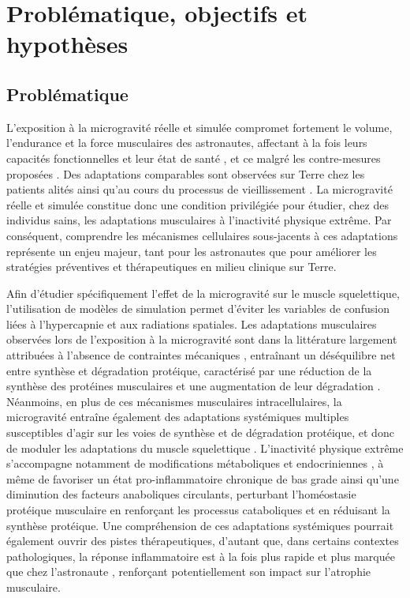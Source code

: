 \documentclass[11pt]{report}
\begin{document}
\chapter{Problématique, objectifs et hypothèses}

\section{Problématique}

L'exposition à la microgravité réelle et simulée compromet fortement le volume, l'endurance et la force musculaires des astronautes, affectant à la fois leurs capacités fonctionnelles \parencite{devirgiliis_spaceflight_2025} et leur état de santé \parencite{beaudart_health_2025}, et ce malgré les contre-mesures proposées \parencite{bosutti_microgravity-induced_2025}. Des adaptations comparables sont observées sur Terre chez les patients alités \parencite{hardy_time_2022} ainsi qu'au cours du processus de vieillissement \parencite{raffin_sedentary_2023}. La microgravité réelle et simulée constitue donc une condition privilégiée pour étudier, chez des individus sains, les adaptations musculaires à l'inactivité physique extrême. Par conséquent, comprendre les mécanismes cellulaires sous-jacents à ces adaptations représente un enjeu majeur, tant pour les astronautes que pour améliorer les stratégies préventives et thérapeutiques en milieu clinique sur Terre. 

Afin d'étudier spécifiquement l'effet de la microgravité sur le muscle squelettique, l'utilisation de modèles de simulation permet d'éviter les variables de confusion liées à l'hypercapnie et aux radiations spatiales. Les adaptations musculaires observées lors de l'exposition à la microgravité sont dans la littérature largement attribuées à l'absence de contraintes mécaniques \parencite{bonanni_microgravity_2023,williams_acclimation_2009}, entraînant un déséquilibre net entre synthèse et dégradation protéique, caractérisé par une réduction de la synthèse des protéines musculaires et une augmentation de leur dégradation \parencite{bosutti_microgravity-induced_2025,liu_mechanisms_2024}. Néanmoins, en plus de ces mécanismes musculaires intracellulaires, la microgravité entraîne également des adaptations systémiques multiples susceptibles d'agir sur les voies de synthèse et de dégradation protéique, et donc de moduler les adaptations du muscle squelettique \parencite{lee_factors_2022}. L'inactivité physique extrême s'accompagne notamment de modifications métaboliques et endocriniennes \parencite{bergouignan_physical_2011,MiriamCapri2025Sep,Eggelbusch2024Jan}, à même de favoriser un état pro-inflammatoire chronique de bas grade ainsi qu'une diminution des facteurs anaboliques circulants, perturbant l'homéostasie protéique musculaire en renforçant les processus cataboliques et en réduisant la synthèse protéique. Une compréhension de ces adaptations systémiques pourrait également ouvrir des pistes thérapeutiques, d'autant que, dans certains contextes pathologiques, la réponse inflammatoire est à la fois plus rapide et plus marquée que chez l'astronaute \parencite{Damanti2024Oct,mehdi_endocrine_2025}, renforçant potentiellement son impact sur l'atrophie musculaire. 
\end{document}
